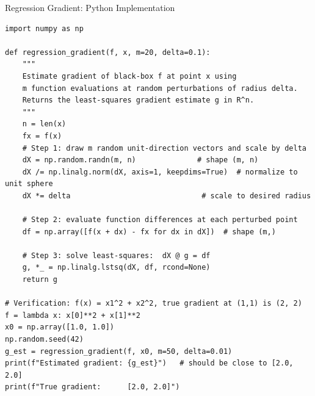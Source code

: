 \documentclass[aspectratio=169,10pt]{beamer}
\begin{document}
\begin{frame}[fragile]{Regression Gradient: Python Implementation}
\begin{lstlisting}[caption={Regression gradient estimator (Algorithm 2.3 in Python)}]
import numpy as np

def regression_gradient(f, x, m=20, delta=0.1):
    """
    Estimate gradient of black-box f at point x using
    m function evaluations at random perturbations of radius delta.
    Returns the least-squares gradient estimate g in R^n.
    """
    n = len(x)
    fx = f(x)
    # Step 1: draw m random unit-direction vectors and scale by delta
    dX = np.random.randn(m, n)              # shape (m, n)
    dX /= np.linalg.norm(dX, axis=1, keepdims=True)  # normalize to unit sphere
    dX *= delta                              # scale to desired radius

    # Step 2: evaluate function differences at each perturbed point
    df = np.array([f(x + dx) - fx for dx in dX])  # shape (m,)

    # Step 3: solve least-squares:  dX @ g = df
    g, *_ = np.linalg.lstsq(dX, df, rcond=None)
    return g

# Verification: f(x) = x1^2 + x2^2, true gradient at (1,1) is (2, 2)
f = lambda x: x[0]**2 + x[1]**2
x0 = np.array([1.0, 1.0])
np.random.seed(42)
g_est = regression_gradient(f, x0, m=50, delta=0.01)
print(f"Estimated gradient: {g_est}")   # should be close to [2.0, 2.0]
print(f"True gradient:      [2.0, 2.0]")
\end{lstlisting}
\end{frame}
\end{document}
